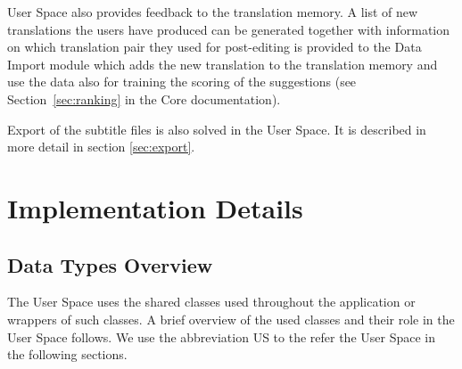 User Space also provides feedback to the translation memory. A list of new translations the users have produced can be generated together with information on which translation pair they used for post-editing is provided to the Data Import module which adds the new translation to the translation memory and use the data also for training the scoring of the suggestions (see Section~\ref{sec:ranking} in the Core documentation).

Export of the subtitle files is also solved in the User Space. It is described in more detail in section \ref{sec:export}.

\section{Implementation Details}
\subsection{Data Types Overview}

The User Space uses the shared classes used throughout the application or wrappers of such classes. A brief overview of the used classes and their role in the User Space follows. We use the abbreviation US to the refer the User Space in the following sections.

